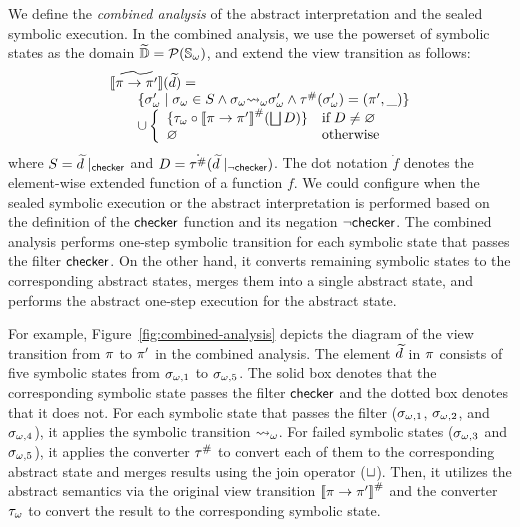 We define the \textit{combined analysis} of the abstract interpretation and the
sealed symbolic execution.  In the combined analysis, we use the powerset of
symbolic states as the domain $\widetilde{\mathbb{D}} = \mathcal{P}({\mathbb{S}}_\omega)$, and extend the
view transition as follows:
\[
  \begin{array}{l}
    [\![{\widetilde{\pi \rightarrow \pi'}}]\!](\widetilde{d}) =\\
    \qquad \{
      {\sigma}_\omega' \mid {\sigma}_\omega \in S \wedge
      {\sigma}_\omega {\leadsto}_\omega {\sigma}_\omega' \wedge
      {\tau}^{\#}({\sigma}_\omega') = (\pi', \_)
    \}\\
    \qquad \cup \left\{
    \begin{array}{ll}
      \{ {\tau}_\omega \circ {[\![{\pi\rightarrow \pi'}]\!]}^{\#}(\bigsqcup D) \}
      & \text{if} \; D \neq \varnothing\\
      \varnothing & \text{otherwise}\\
    \end{array}
    \right.
  \end{array}
\]
where $S = \widetilde{d}\mid_{\textsf{checker}}$ and $D =
\dot{{\tau}^{\#}}(\widetilde{d}\mid_{\neg\textsf{checker}})$.  The dot notation $\dot{f}$
denotes the element-wise extended function of a function $f$.  We could
configure when the sealed symbolic execution or the abstract interpretation is
performed based on the definition of the $\textsf{checker}$ function and its negation
$\neg\textsf{checker}$.  The combined analysis performs one-step symbolic transition for
each symbolic state that passes the filter $\textsf{checker}$. On the other hand, it
converts remaining symbolic states to the corresponding abstract states, merges
them into a single abstract state, and performs the abstract one-step execution
for the abstract state.

For example, Figure~\ref{fig:combined-analysis} depicts the
diagram of the view transition from $\pi$ to $\pi'$ in the combined
analysis.  The element $\widetilde{d}$ in $\pi$ consists of five symbolic states
from $\sigma_{\omega,1}$ to $\sigma_{\omega,5}$.  The solid box denotes that the corresponding
symbolic state passes the filter $\textsf{checker}$ and the dotted box denotes that it
does not.  For each symbolic state that passes the filter ($\sigma_{\omega,1}$,
$\sigma_{\omega,2}$, and $\sigma_{\omega,4}$), it applies the symbolic transition ${\leadsto}_\omega$.
For failed symbolic states ($\sigma_{\omega,3}$ and $\sigma_{\omega,5}$), it applies the
converter ${\tau}^{\#}$ to convert each of them to the corresponding abstract
state and merges results using the join operator ($\sqcup$).  Then, it utilizes
the abstract semantics via the original view transition
${[\![{\pi \rightarrow \pi'}]\!]}^{\#}$ and the converter ${\tau}_\omega$ to convert the
result to the corresponding symbolic state.

